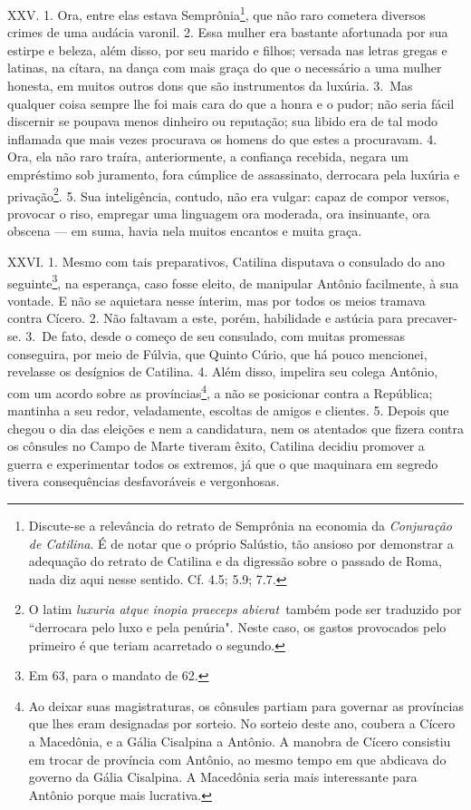 XXV. 1. Ora, entre elas estava Semprônia\footnote{Discute-se a relevância do
retrato de Semprônia na economia da \emph{Conjuração de Catilina}. É de notar
que o próprio Salústio, tão ansioso por demonstrar a adequação do retrato de
Catilina e da digressão sobre o passado de Roma, nada diz aqui nesse sentido.
Cf. 4.5; 5.9; 7.7.}, que não raro cometera diversos crimes de uma audácia
varonil. 2. Essa mulher era bastante afortunada por sua estirpe e beleza, além
disso, por seu marido e filhos; versada nas letras gregas e latinas, na cítara,
na dança com mais graça do que o necessário a uma mulher honesta, em muitos
outros dons que são instrumentos da luxúria. 3.~Mas qualquer coisa sempre lhe
foi mais cara do que a honra e o pudor; não seria fácil discernir se poupava
menos dinheiro ou reputação; sua libido era de tal modo inflamada que mais
vezes procurava os homens do que estes a procuravam. 4. Ora, ela não raro
traíra, anteriormente, a confiança recebida, negara um empréstimo sob
juramento, fora cúmplice de assassinato, derrocara pela luxúria e privação\footnote{O latim \emph{luxuria atque inopia praeceps abierat}\ também pode ser traduzido por ``derrocara pelo luxo e pela penúria". Neste caso, os gastos provocados pelo primeiro é que teriam acarretado o segundo.}. 5. 
Sua inteligência, contudo, não era vulgar: capaz de compor versos, provocar o
riso, empregar uma linguagem ora moderada, ora insinuante, ora obscena --- em
suma, havia nela muitos encantos e muita graça.

XXVI. 1. Mesmo com tais preparativos, Catilina disputava o consulado do ano
seguinte\footnote{Em 63, para o mandato de 62.}, na esperança, caso fosse
eleito, de manipular Antônio facilmente, à sua vontade. E não se aquietara
nesse ínterim, mas por todos os meios tramava contra Cícero. 2. Não faltavam a
este, porém, habilidade e astúcia para precaver-se. 3.~De fato, desde o começo
de seu consulado, com muitas promessas conseguira, por meio de Fúlvia, que
Quinto Cúrio, que há pouco mencionei, revelasse os desígnios de Catilina. 4.
Além disso, impelira seu colega Antônio, com um acordo sobre as
províncias\footnote{Ao deixar suas magistraturas, os cônsules partiam para
governar as províncias que lhes eram designadas por sorteio. No sorteio deste
ano, coubera a Cícero a Macedônia, e a Gália Cisalpina a Antônio. A manobra de Cícero
consistiu em trocar de província com Antônio, ao mesmo tempo em que abdicava do
governo da Gália Cisalpina. A Macedônia seria mais interessante para Antônio porque mais
lucrativa.}, a não se posicionar contra a República; mantinha a seu redor,
veladamente, escoltas de amigos e clientes. 5. Depois que chegou o dia das
eleições e nem a candidatura, nem os atentados que fizera contra os cônsules no
Campo de Marte tiveram êxito, Catilina decidiu promover a guerra e experimentar
todos os extremos, já que o que maquinara em segredo tivera consequências
desfavoráveis e vergonhosas.

